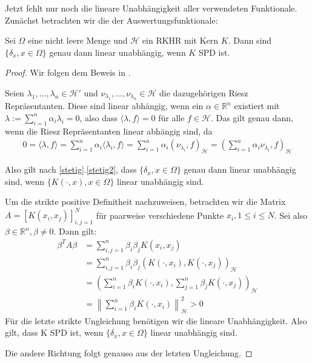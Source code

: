Jetzt fehlt nur noch die lineare Unabhängigkeit aller verwendeten Funktionale. Zunächst betrachten wir die der Auswertungsfunktionale:
\begin{theorem}
Sei $\Omega$ eine nicht leere Menge und $\mathcal{H}$ ein \ac{RKHR} mit Kern $K$. Dann sind $\{\delta_x,x\in \Omega\}$ genau dann linear unabhängig, wenn $K$ \ac{SPD} ist.
\end{theorem}

\begin{proof}
Wir folgen dem Beweis in \textcite[Proposition 3.8]{Santin.2017}.

Seien $\lambda_1, \dots, \lambda_n \in \mathcal{H}'$ und $\nu_{\lambda_1},\dots, \nu_{\lambda_n} \in \mathcal{H}$ die dazugehörigen Riesz Repräsentanten. Diese sind linear abhängig, wenn ein $\alpha \in \mathbb{R}^n$ existiert mit $\lambda := \sum_{i=1}^n \alpha_i \lambda_i = 0$, also dass $\langle \lambda,f \rangle = 0$ für alle $f \in \mathcal{H}$. Das gilt genau dann, wenn die Riesz Repräsentanten linear abhängig sind, da
\begin{align*}
0 = \langle \lambda,f \rangle = \sum_{i=1}^n \alpha_i \langle \lambda_i,f \rangle = \sum_{i=1}^n \alpha_i \left( \nu_{\lambda_i},f\right)_\mathcal{H} = \left( \sum_{i=1}^n \alpha_i \nu_{\lambda_i}, f \right)_\mathcal{H}
\end{align*}

Also gilt nach \ref{stetig}.\ref{stetig2}, dass $\{\delta_x,x\in \Omega\}$ genau dann linear unabhängig sind, wenn $\{K(\cdot,x) , x \in \Omega\}$ linear unabhängig sind.

Um die strikte positive Definitheit nachzuweisen, betrachten wir die Matrix $A=[K(x_i, x_j)]_{i,j=1}^N$ für paarweise verschiedene Punkte $x_i, 1 \le i \le N$. Sei also $\beta \in \mathbb{R}^n, \beta \neq 0$. Dann gilt:
\begin{align*}
\beta^T A \beta &= \sum_{i,j=1}^n \beta_i \beta_j K(x_i, x_j)\\
&= \sum_{i,j=1}^n \beta_i  \beta_j \left(K(\cdot, x_i),K(\cdot,x_j)\right)_\mathcal{H}\\
&= \left( \sum_{i=1}^n \beta_i K(\cdot,x_i),\sum_{j=1}^n \beta_j K(\cdot, x_j) \right)_\mathcal{H}\\
&= \left\| \sum_{i=1}^n \beta_i K(\cdot, x_i) \right\|_\mathcal{H}^2 > 0
\end{align*}
Für die letzte strikte Ungleichung benötigen wir die lineare Unabhängigkeit. Also gilt, dass K \ac{SPD} ist, wenn $\{\delta_x,x\in \Omega\}$ linear unabhängig sind.

Die andere Richtung folgt genauso aus der letzten Ungleichung.
\end{proof}

